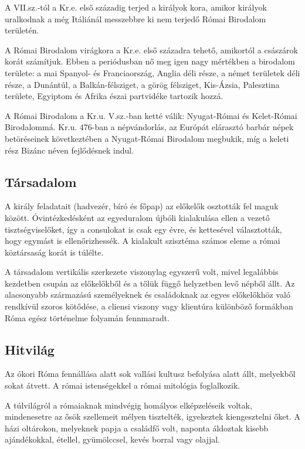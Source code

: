 	A VII.sz.-tól a Kr.e. első századig terjed a királyok kora, amikor királyok uralkodnak a még Itáliánál messzebbre ki nem terjedő Római Birodalom területén.
	
	A Római Birodalom virágkora a Kr.e. első századra tehető, amikortól a császárok korát számítjuk. Ebben a periódusban nő meg igen nagy mértékben a birodalom területe: a mai Spanyol- és Franciaország, Anglia déli része, a német területek déli része, a Dunántúl, a Balkán-félsziget, a görög félsziget, Kis-Ázsia, Palesztina területe, Egyiptom és Afrika észai partvidéke tartozik hozzá.
	
	A Római Birodalom a Kr.u. V.sz.-ban ketté válik: Nyugat-Római és Kelet-Római Birodalommá. Kr.u. 476-ban a népvándorlás, az Európát elárasztó barbár népek betöréseinek következtében a Nyugat-Római Birodalom megbukik, míg a keleti rész Bizánc néven fejlődésnek indul.

\subsection*{Társadalom}

A király feladatait (hadvezér, bíró és főpap) az előkelők osztották fel maguk között. Óvintézkedésként az egyeduralom újbóli kialakulása ellen a vezető tisztségviselőket, így a consulokat is csak egy évre, és kettesével választották, hogy egymást is ellenőrizhessék. A kialakult szisztéma számos eleme a római köztársaság korát is túlélte.

A társadalom vertikális szerkezete viszonylag egyszerű volt, mivel legalábbis kezdetben csupán az előkelőkből és a tőlük függő helyzetben levő népből állt. Az alacsonyabb származású személyeknek és családoknak az egyes előkelőkhöz való rendkívül szoros kötődése, a cliensi viszony vagy klientúra különböző formákban Róma egész történelme folyamán fennmaradt.

\subsection*{Hitvilág}

Az ókori Róma fennállása alatt sok vallási kultusz befolyása alatt állt, melyekből sokat átvett. A római istenségekkel a római mitológia foglalkozik.

A túlvilágról a rómaiaknak mindvégig homályos elképzeléseik voltak, mindenesetre az ősök szellemeit mélyen tisztelték, igyekeztek kiengesztelni őket. A házi oltárokon, melyeknek papja a családfő volt, naponta áldoztak kisebb ajándékokkal, étellel, gyümölccsel, kevés borral vagy olajjal.

